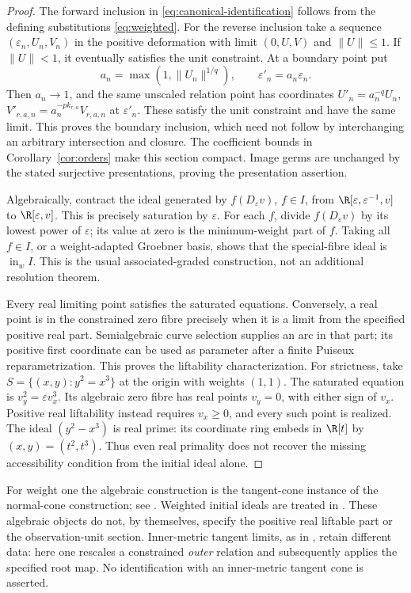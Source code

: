 \begin{proof}
The forward inclusion in \eqref{eq:canonical-identification} follows
from the defining substitutions \eqref{eq:weighted}. For the reverse
inclusion take a sequence
$(\varepsilon_n,U_n,V_n)$ in the positive deformation with limit
$(0,U,V)$ and $\|U\|\le1$. If $\|U\|<1$, it eventually satisfies the
unit constraint. At a boundary point put
\[
 a_n=\max(1,\|U_n\|^{1/q}),\qquad
 \varepsilon'_n=a_n\varepsilon_n.
\]
Then $a_n\to1$, and the same unscaled relation point has coordinates
$U'_n=a_n^{-q}U_n$, $V'_{r,a,n}=a_n^{-p k_{r,a}}V_{r,a,n}$ at
$\varepsilon'_n$. These satisfy the unit constraint and have the same
limit. This proves the boundary inclusion, which need not follow by
interchanging an arbitrary intersection and closure. The coefficient
bounds in Corollary~\ref{cor:orders} make this section compact.
Image germs are unchanged by the stated surjective presentations, proving
the presentation assertion.

Algebraically, contract the ideal generated by
$f(D_\varepsilon v)$, $f\in I$, from
$\R[\varepsilon,\varepsilon^{-1},v]$ to $\R[\varepsilon,v]$.
This is precisely saturation by $\varepsilon$. For each $f$, divide
$f(D_\varepsilon v)$ by its lowest power of $\varepsilon$; its value
at zero is the minimum-weight part of $f$. Taking all $f\in I$, or a
weight-adapted Groebner basis, shows that the special-fibre ideal is
$\operatorname{in}_w I$. This is the usual associated-graded
construction, not an additional resolution theorem.

Every real limiting point satisfies the saturated equations. Conversely,
a real point is in the constrained zero fibre precisely when it is a
limit from the specified positive real part. Semialgebraic curve
selection supplies an arc in that part; its positive first coordinate
can be used as parameter after a finite Puiseux reparametrization.
This proves the liftability characterization. For strictness, take
$S=\{(x,y):y^2=x^3\}$ at the origin with weights $(1,1)$.
The saturated equation is $v_y^2=\varepsilon v_x^3$.
Its algebraic zero fibre has real points $v_y=0$, with either sign of
$v_x$. Positive real liftability instead requires $v_x\ge0$, and
every such point is realized. The ideal $(y^2-x^3)$ is real prime:
its coordinate ring embeds in $\R[t]$ by $(x,y)=(t^2,t^3)$.
Thus even real primality does not recover the missing accessibility
condition from the initial ideal alone.
\end{proof}

For weight one the algebraic construction is the tangent-cone instance
of the normal-cone construction; see \cite{Fulton98,StacksCone}.
Weighted initial ideals are treated in \cite{MS15}. These algebraic
objects do not, by themselves, specify the positive real liftable part
or the observation-unit section. Inner-metric tangent limits, as in
\cite{BL07}, retain different data: here one rescales a constrained
\emph{outer} relation and subsequently applies the specified root map.
No identification with an inner-metric tangent cone is asserted.

